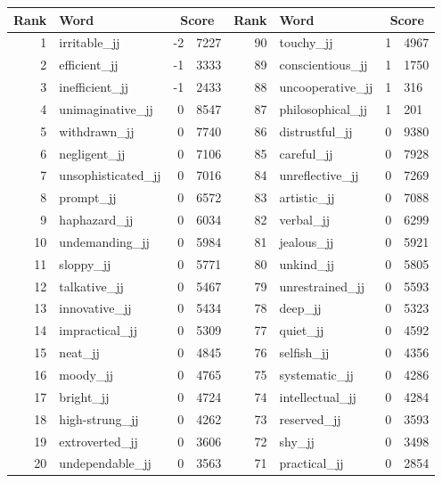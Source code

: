 \begin{table}[tbp]
    \begin{tabular}{| rlr@{.}l | rlr@{.}l |}
    \hline
    \textbf{Rank} & \textbf{Word} & \multicolumn{2}{c|}{\textbf{Score}} & \textbf{Rank} & \textbf{Word} & \multicolumn{2}{c|}{\textbf{Score}} \\
    \hline
    1 & irritable\_jj & -2 & 7227    &    90 & touchy\_jj & 1 & 4967 \\
    2 & efficient\_jj & -1 & 3333    &    89 & conscientious\_jj & 1 & 1750 \\
    3 & inefficient\_jj & -1 & 2433    &    88 & uncooperative\_jj & 1 & 316 \\
    4 & unimaginative\_jj & 0 & 8547    &    87 & philosophical\_jj & 1 & 201 \\
    5 & withdrawn\_jj & 0 & 7740    &    86 & distrustful\_jj & 0 & 9380 \\
    6 & negligent\_jj & 0 & 7106    &    85 & careful\_jj & 0 & 7928 \\
    7 & unsophisticated\_jj & 0 & 7016    &    84 & unreflective\_jj & 0 & 7269 \\
    8 & prompt\_jj & 0 & 6572    &    83 & artistic\_jj & 0 & 7088 \\
    9 & haphazard\_jj & 0 & 6034    &    82 & verbal\_jj & 0 & 6299 \\
    10 & undemanding\_jj & 0 & 5984    &    81 & jealous\_jj & 0 & 5921 \\
    11 & sloppy\_jj & 0 & 5771    &    80 & unkind\_jj & 0 & 5805 \\
    12 & talkative\_jj & 0 & 5467    &    79 & unrestrained\_jj & 0 & 5593 \\
    13 & innovative\_jj & 0 & 5434    &    78 & deep\_jj & 0 & 5323 \\
    14 & impractical\_jj & 0 & 5309    &    77 & quiet\_jj & 0 & 4592 \\
    15 & neat\_jj & 0 & 4845    &    76 & selfish\_jj & 0 & 4356 \\
    16 & moody\_jj & 0 & 4765    &    75 & systematic\_jj & 0 & 4286 \\
    17 & bright\_jj & 0 & 4724    &    74 & intellectual\_jj & 0 & 4284 \\
    18 & high-strung\_jj & 0 & 4262    &    73 & reserved\_jj & 0 & 3593 \\
    19 & extroverted\_jj & 0 & 3606    &    72 & shy\_jj & 0 & 3498 \\
    20 & undependable\_jj & 0 & 3563    &    71 & practical\_jj & 0 & 2854 \\

\end{tabular}
\end{table}
